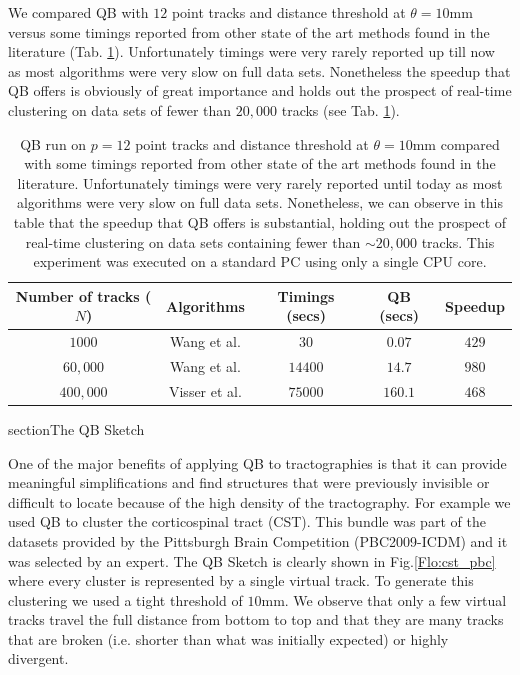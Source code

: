 \documentclass[preprint,authoryear,a4paper,10pt,onecolumn]{elsarticle}
\begin{document}
We compared QB with $12$ point tracks and distance threshold at
$\theta=10$mm versus some timings reported from other state of the art
methods found in the literature (Tab. \ref{Flo:timings}). Unfortunately
timings were very rarely reported up till now as most algorithms were
very slow on full data sets. Nonetheless the speedup that QB offers is
obviously of great importance and holds out the prospect of real-time
clustering on data sets of fewer than $20,000$ tracks (see
Tab. \ref{Flo:timings}).

%
\begin{table}
\small\addtolength{\tabcolsep}{-5pt}

\begin{centering}
\begin{tabular}{|c|c|c|c|c|}
\hline 
Number of tracks ($N$) & Algorithms & Timings (secs) & QB (secs) & Speedup\tabularnewline
\hline
\hline 
$1000$ & Wang et al. \cite{wang2010tractography} & $30$ & $0.07$ & $429$\tabularnewline
\hline 
$60,000$ & Wang et al. \cite{wang2010tractography} & $14400$ & $14.7$ & $980$\tabularnewline
\hline 
$400,000$ & Visser et al. \cite{Visser2010} & $75000$ & $160.1$ & $468$\tabularnewline
\hline
\end{tabular}
\par\end{centering}

\caption{QB run on $p=12$ point tracks and distance threshold at $\theta=10$mm
compared with some timings reported from other state of the art methods
found in the literature. Unfortunately timings were very rarely reported
until today as most algorithms were very slow on full data sets. Nonetheless,
we can observe in this table that the speedup that QB offers is substantial,
holding out the prospect of real-time clustering on data sets containing
fewer than $\sim20,000$ tracks. This experiment was executed on a
standard PC using only a single CPU core. }

\label{Flo:timings}
\end{table}

section{The QB Sketch}

One of the major benefits of applying QB to tractographies is that it
can provide meaningful simplifications and find structures that were
previously invisible or difficult to locate because of the high density
of the tractography. For example we used QB to cluster the corticospinal
tract (CST). This bundle was part of the datasets provided by the
Pittsburgh Brain Competition (PBC2009-ICDM) and it was selected by an
expert. The QB Sketch is clearly shown in Fig.\ref{Flo:cst_pbc} where
every cluster is represented by a single virtual track. To generate this
clustering we used a tight threshold of $10$mm. We observe that only a
few virtual tracks travel the full distance from bottom to top and that
they are many tracks that are broken (i.e. shorter than what was
initially expected) or highly divergent.
\end{document}
